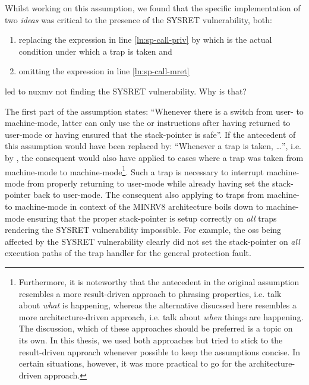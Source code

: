 Whilst working on this assumption, we found that the specific implementation of two \textit{ideas} was critical to the presence of the SYSRET vulnerability, both:
\begin{enumerate}
    \item \label{itm:no-sysret-priv}
    replacing the expression  in line \ref{ln:sp-call-priv} by  which is the actual condition under which a trap is taken and
    \item \label{itm:no-sysret-mret}
    omitting the expression  in line \ref{ln:sp-call-mret}
\end{enumerate}
led to \gls{nuxmv} not finding the SYSRET vulnerability.
Why is that?

The first part of the  assumption states: \enquote{Whenever there is a switch from user- to machine-mode, latter can only use the  or  instructions after having returned to user-mode or having ensured that the stack-pointer is safe}.
If the antecedent of this assumption would have been replaced by: \enquote{Whenever a trap is taken, \dots}, i.e. by , the consequent would also have applied to cases where a trap was taken from machine-mode to machine-mode\footnote{
    Furthermore, it is noteworthy that the antecedent in the original assumption resembles a more result-driven approach to phrasing properties, i.e. talk about \textit{what} is happening, whereas the alternative disucssed here resembles a more architecture-driven approach, i.e. talk about \textit{when} things are happening.
    The discussion, which of these approaches should be preferred is a topic on its own.
    In this thesis, we used both approaches but tried to stick to the result-driven approach whenever possible to keep the assumptions concise.
    In certain situations, however, it was more practical to go for the architecture-driven approach.
}.
Such a trap is necessary to interrupt machine-mode from properly returning to user-mode while already having set the stack-pointer back to user-mode.
The consequent also applying to traps from machine- to machine-mode in context of the MINRV8 architecture boils down to machine-mode ensuring that the proper stack-pointer is setup correctly on \textit{all} traps rendering the SYSRET vulnerability impossible.
For example, the \glspl{os} being affected by the SYSRET vulnerability clearly did not set the stack-pointer on \textit{all} execution paths of the trap handler for the general protection fault.

